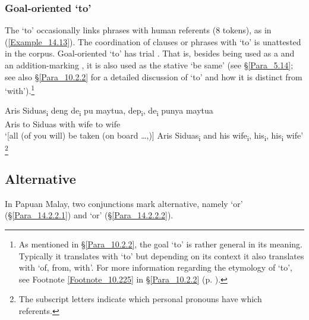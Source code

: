 \subsubsection[Goal{}-oriented sama ‘to’]{Goal-oriented  ‘to’}
\label{Para_14.2.1.3}
The    ‘to’ occasionally links  phrases with human referents (8 tokens), as in (\ref{Example_14.13}). The coordination of clauses or  phrases with  ‘to’ is unattested in the corpus. Goal-oriented  ‘to’ has trial . That is, besides being used as a  and an addition-marking , it is also used as the stative   ‘be same’ (see §\ref{Para_5.14}; see also §\ref{Para_10.2.2} for a detailed discussion of   ‘to’ and how it is distinct from   ‘with’).\footnote{As mentioned in §\ref{Para_10.2.2}, the goal   ‘to’ is rather general in its meaning. Typically it translates with ‘to’ but depending on its context it also translates with ‘of, from, with’. For more information regarding the etymology of  ‘to’, see Footnote \ref{Footnote_10.225} in §\ref{Para_10.2.2} (p. \pageref{Footnote_10.225}).}
%

\ea
\label{Example_14.13}

\gll       {\ldots}  Aris   Siduas\textsubscript{i}  deng  de\textsubscript{i}  pu  maytua,   dep\textsubscript{i},   de\textsubscript{i}  punya  maytua\\
{ } Aris  to  Siduas  with    wife  to        wife\\
\glt ‘[all (of you will) be taken (on board {\ldots},)] Aris  Siduas\textsubscript{i} and his wife\textsubscript{i},  his\textsubscript{i}, his\textsubscript{i} wife’ \textstyleExampleSource{[080922-001a-CvPh.0493/0497]}\footnote{The subscript letters indicate which personal pronouns have which referents.}
\z


\subsection{Alternative}
\label{Para_14.2.2}
In Papuan Malay, two conjunctions mark alternative, namely   ‘or’ (§\ref{Para_14.2.2.1}) and   ‘or’ (§\ref{Para_14.2.2.2}).


